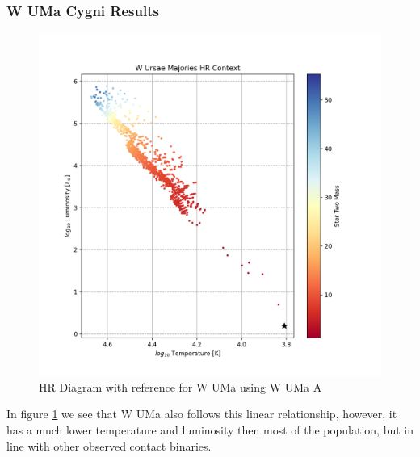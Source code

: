 \documentclass[12pt, letterpaper]{article}
\begin{document}
        
        \subsubsection{W UMa Cygni Results}
            \begin{figure}[H]
                \centering
                \includegraphics[scale = .6]{figs/Generated Figs/ W Ursae Majories HR Context Star Two Mass log10 F star radius 5.png}
                \caption{HR Diagram with reference for W UMa using W UMa A}
                \label{WUMaResults}
            \end{figure}
            In figure \ref{WUMaResults} we see that W UMa also follows this linear relationship, however, it has a much lower temperature and luminosity then most of the population, but in line with other observed contact binaries.  
\end{document}

